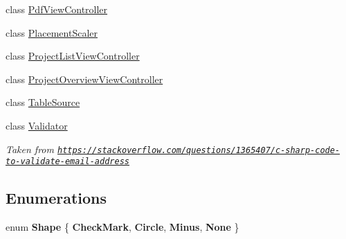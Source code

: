\begin{DoxyCompactItemize}
\item 
class \hyperlink{class_ramboell_1_1i_o_s_1_1_pdf_view_controller}{Pdf\+View\+Controller}
\item 
class \hyperlink{class_ramboell_1_1i_o_s_1_1_placement_scaler}{Placement\+Scaler}
\item 
class \hyperlink{class_ramboell_1_1i_o_s_1_1_project_list_view_controller}{Project\+List\+View\+Controller}
\item 
class \hyperlink{class_ramboell_1_1i_o_s_1_1_project_overview_view_controller}{Project\+Overview\+View\+Controller}
\item 
class \hyperlink{class_ramboell_1_1i_o_s_1_1_table_source}{Table\+Source}
\item 
class \hyperlink{class_ramboell_1_1i_o_s_1_1_validator}{Validator}
\begin{DoxyCompactList}\small\item\em Taken from \href{https://stackoverflow.com/questions/1365407/c-sharp-code-to-validate-email-address}{\tt https\+://stackoverflow.\+com/questions/1365407/c-\/sharp-\/code-\/to-\/validate-\/email-\/address} \end{DoxyCompactList}\end{DoxyCompactItemize}
\subsection*{Enumerations}
\begin{DoxyCompactItemize}
\item 
\mbox{\label{namespace_ramboell_1_1i_o_s_a09dbebf981b31cf2a6ca60ce1f4aa190}} 
enum {\bfseries Shape} \{ {\bfseries Check\+Mark}, 
{\bfseries Circle}, 
{\bfseries Minus}, 
{\bfseries None}
 \}
\end{DoxyCompactItemize}
